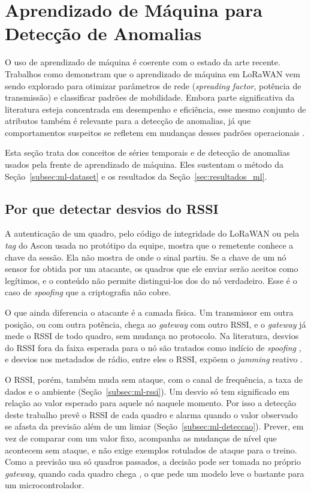 \section{Aprendizado de Máquina para Detecção de Anomalias}
\label{sec:ml-conceitos}

O uso de aprendizado de máquina é coerente com o estado da arte recente.
Trabalhos como \cite{farhad2023} demonstram que o aprendizado de máquina em
LoRaWAN vem sendo explorado para otimizar parâmetros de rede
(\textit{spreading factor}, potência de transmissão) e classificar padrões
de mobilidade. Embora parte significativa da literatura esteja concentrada em
desempenho e eficiência, esse mesmo conjunto de atributos também é relevante
para a detecção de anomalias, já que comportamentos suspeitos se refletem em
mudanças desses padrões operacionais \cite{farhad2023, vangelista2023}.

Esta seção trata dos conceitos de séries temporais e de detecção de anomalias
usados pela frente de aprendizado de máquina. Eles sustentam o método da
Seção~\ref{subsec:ml-dataset} e os resultados da Seção~\ref{sec:resultados_ml}.


\subsection{Por que detectar desvios do RSSI}
\label{subsec:ml-motivacao}

A autenticação de um quadro, pelo código de integridade do LoRaWAN ou pela
\textit{tag} do Ascon usada no protótipo da equipe, mostra que o remetente
conhece a chave da sessão. Ela não mostra de onde o sinal partiu. Se a chave de
um nó sensor for obtida por um atacante, os quadros que ele enviar serão
aceitos como legítimos, e o conteúdo não permite distingui-los dos do nó
verdadeiro. Esse é o caso de \textit{spoofing} que a criptografia não cobre.

O que ainda diferencia o atacante é a camada física. Um transmissor em outra
posição, ou com outra potência, chega ao \textit{gateway} com outro RSSI, e o
\textit{gateway} já mede o RSSI de todo quadro, sem mudança no protocolo. Na
literatura, desvios do RSSI fora da faixa esperada para o nó são tratados como
indício de \textit{spoofing} \cite{pourghasem2025spoofing}, e desvios nos
metadados de rádio, entre eles o RSSI, expõem o \textit{jamming} reativo
\cite{ruotsalainen2022jamming}.

O RSSI, porém, também muda sem ataque, com o canal de frequência, a taxa de
dados e o ambiente (Seção~\ref{subsec:ml-rssi}). Um desvio só tem significado
em relação ao valor esperado para aquele nó naquele momento. Por isso a
detecção deste trabalho prevê o RSSI de cada quadro e alarma quando o valor
observado se afasta da previsão além de um limiar
(Seção~\ref{subsec:ml-deteccao}). Prever, em vez de comparar com um valor
fixo, acompanha as mudanças de nível que acontecem sem ataque, e não exige
exemplos rotulados de ataque para o treino. Como a previsão usa só quadros
passados, a decisão pode ser tomada no próprio \textit{gateway}, quando cada
quadro chega \cite{blazquez2021review}, o que pede um modelo leve o bastante
para um microcontrolador.

